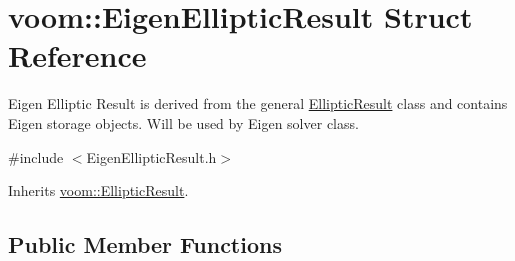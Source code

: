 \hypertarget{structvoom_1_1_eigen_elliptic_result}{
\section{voom::EigenEllipticResult Struct Reference}
\label{structvoom_1_1_eigen_elliptic_result}
}


Eigen Elliptic Result is derived from the general \hyperlink{structvoom_1_1_elliptic_result}{EllipticResult} class and contains Eigen storage objects. Will be used by Eigen solver class.  


{\ttfamily \#include $<$EigenEllipticResult.h$>$}

Inherits \hyperlink{structvoom_1_1_elliptic_result}{voom::EllipticResult}.\subsection*{Public Member Functions}
